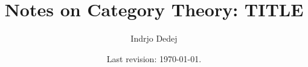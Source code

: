 



\usepackage{xr}


\title{Notes on Category Theory: TITLE}
\author{Indrjo Dedej}
\date{Last revision: \today{}.}



\maketitle

\tableofcontents




